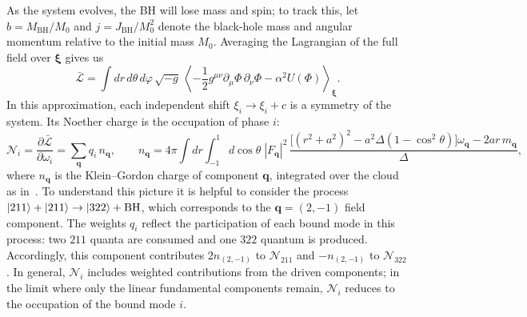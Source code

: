 \documentclass[11pt]{article}
\begin{document}
As the system evolves, the BH will lose mass and spin; to track this, let $b=M_{\mathrm{BH}}/M_0$ and $j=J_{\mathrm{BH}}/M_0^2$ denote the black-hole mass and angular momentum relative to the initial mass $M_0$. Averaging the Lagrangian of the full field over $\boldsymbol{\xi}$ gives us
\begin{equation}
    \bar{\mathcal L} = \int dr\,d\theta\,d\varphi\, \sqrt{-g}\, \left\langle -\frac12 g^{\mu\nu}\partial_\mu\Phi\,\partial_\nu\Phi -\alpha^2U(\Phi) \right\rangle_{\boldsymbol\xi}.
\end{equation}
In this approximation, each independent shift $\xi_i\to\xi_i+c$ is a symmetry of the system. Its Noether charge is the occupation of phase $i$:
\begin{equation}
    \label{eq:wave_action}
    \mathcal{N}_i = \frac{\partial\bar{\mathcal{L}}}{\partial\omega_i} = \sum_{\mathbf{q}} q_i\, n_\mathbf{q},
    \qquad
    n_\mathbf{q} = 4\pi\int dr\int_{-1}^{1}d\cos\theta\;|F_\mathbf{q}|^2\,
    \frac{\big[(r^2+a^2)^2-a^2\Delta(1-\cos^2\theta)\big]\omega_\mathbf{q}-2a r\,m_\mathbf{q}}{\Delta},
\end{equation}
where $n_\mathbf{q}$ is the Klein--Gordon charge of component $\mathbf{q}$, integrated over the cloud as in~\cite{Hayes_1970}. To understand this picture it is helpful to consider the process $\ket{211} + \ket{211} \rightarrow \ket{322} + \text{BH}$, which corresponds to the $\mathbf{q} = (2, -1)$ field component. The weights $q_i$ reflect the participation of each bound mode in this process: two $211$ quanta are consumed and one $322$ quantum is produced. Accordingly, this component contributes $2n_{(2,-1)}$ to $\mathcal{N}_{211}$ and $-n_{(2,-1)}$ to $\mathcal{N}_{322}$. In general, $\mathcal{N}_i$ includes weighted contributions from the driven components; in the limit where only the linear fundamental components remain, $\mathcal{N}_i$ reduces to the occupation of the bound mode $i$.
\end{document}
